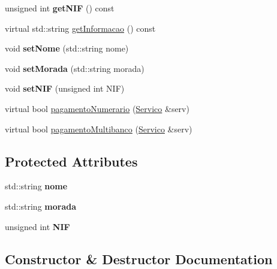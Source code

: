 \begin{DoxyCompactItemize}
unsigned int {\bfseries get\+N\+IF} () const
\item 
virtual std\+::string \hyperlink{class_cliente_a932ef71b2792dc5df153f82d3e81a6f3}{get\+Informacao} () const
\item 
\hypertarget{class_cliente_a6f69591975dd6db60d61da4744a61d95}{}\label{class_cliente_a6f69591975dd6db60d61da4744a61d95} 
void {\bfseries set\+Nome} (std\+::string nome)
\item 
\hypertarget{class_cliente_ac153d8134504564bb599d47611cd7726}{}\label{class_cliente_ac153d8134504564bb599d47611cd7726} 
void {\bfseries set\+Morada} (std\+::string morada)
\item 
\hypertarget{class_cliente_a203e0f379622d73f1f58f2d650233a8d}{}\label{class_cliente_a203e0f379622d73f1f58f2d650233a8d} 
void {\bfseries set\+N\+IF} (unsigned int N\+IF)
\item 
virtual bool \hyperlink{class_cliente_a68646846a80de5cdcb61b1f8a13e4fb8}{pagamento\+Numerario} (\hyperlink{class_servico}{Servico} \&serv)
\item 
virtual bool \hyperlink{class_cliente_a6e230e5e512bebe07bfa1ad6750b8cee}{pagamento\+Multibanco} (\hyperlink{class_servico}{Servico} \&serv)
\end{DoxyCompactItemize}
\subsection*{Protected Attributes}
\begin{DoxyCompactItemize}
\item 
\hypertarget{class_cliente_aaa79b0a26f7d5d007fe4ae9696564ca5}{}\label{class_cliente_aaa79b0a26f7d5d007fe4ae9696564ca5} 
std\+::string {\bfseries nome}
\item 
\hypertarget{class_cliente_a24ba6895be9bdf5112e9e67a34d13704}{}\label{class_cliente_a24ba6895be9bdf5112e9e67a34d13704} 
std\+::string {\bfseries morada}
\item 
\hypertarget{class_cliente_a7a012a7819f17eb18a9580fe32723aeb}{}\label{class_cliente_a7a012a7819f17eb18a9580fe32723aeb} 
unsigned int {\bfseries N\+IF}
\end{DoxyCompactItemize}


\subsection{Constructor \& Destructor Documentation}
\hypertarget{class_cliente_a5957c05b3d3594a7cbd8c088486d14ae}{}\label{class_cliente_a5957c05b3d3594a7cbd8c088486d14ae} 
